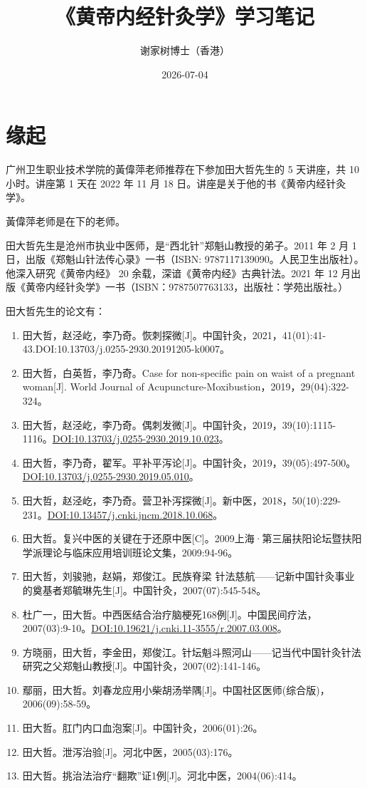 \documentclass[
]{book}
\title{《黄帝内经针灸学》学习笔记}
\author{谢家树博士（香港）}
\date{2026-07-04}
\begin{document}
\maketitle

{
\setcounter{tocdepth}{1}
\tableofcontents
}
\chapter*{缘起}\label{ux7f18ux8d77}

广州卫生职业技术学院的黃偉萍老师推荐在下参加田大哲先生的 5 天讲座，共 10 小时。讲座第 1 天在 2022 年 11 月 18 日。讲座是关于他的书《黄帝内经针灸学》。

黃偉萍老师是在下的老师。

田大哲先生是沧州市执业中医师，是``西北针''郑魁山教授的弟子。2011 年 2 月 1 日，出版《郑魁山针法传心录》一书（ISBN: 9787117139090。人民卫生出版社）。他深入研究《黄帝内经》 20 余载，深谙《黄帝内经》古典针法。2021 年 12 月出版《黄帝内经针灸学》一书（ISBN：9787507763133，出版社：学苑出版社。）

田大哲先生的论文有：

\begin{enumerate}
\def\labelenumi{\arabic{enumi}.}
\item
  田大哲，赵泾屹，李乃奇。恢刺探微{[}J{]}。中国针灸，2021，41(01):41-43.DOI:10.13703/j.0255-2930.20191205-k0007。
\item
  田大哲，白英哲，李乃奇。Case for non-specific pain on waist of a pregnant woman{[}J{]}. World Journal of Acupuncture-Moxibustion，2019，29(04):322-324。
\item
  田大哲，赵泾屹，李乃奇。偶刺发微{[}J{]}。中国针灸，2019，39(10):1115-1116。\url{DOI:10.13703/j.0255-2930.2019.10.023}。
\item
  田大哲，李乃奇，翟军。平补平泻论{[}J{]}。中国针灸，2019，39(05):497-500。\url{DOI:10.13703/j.0255-2930.2019.05.010}。
\item
  田大哲，赵泾屹，李乃奇。营卫补泻探微{[}J{]}。新中医，2018，50(10):229-231。\url{DOI:10.13457/j.cnki.jncm.2018.10.068}。
\item
  田大哲。复兴中医的关键在于还原中医{[}C{]}。2009上海·第三届扶阳论坛暨扶阳学派理论与临床应用培训班论文集，2009:94-96。
\item
  田大哲，刘骏驰，赵娟，郑俊江。民族脊梁 针法慈航------记新中国针灸事业的奠基者郑毓琳先生{[}J{]}。中国针灸，2007(07):545-548。
\item
  杜广一，田大哲。中西医结合治疗脑梗死168例{[}J{]}。中国民间疗法，2007(03):9-10。\url{DOI:10.19621/j.cnki.11-3555/r.2007.03.008}。
\item
  方晓丽，田大哲，李金田，郑俊江。针坛魁斗照河山------记当代中国针灸针法研究之父郑魁山教授{[}J{]}。中国针灸，2007(02):141-146。
\item
  鄢丽，田大哲。刘春龙应用小柴胡汤举隅{[}J{]}。中国社区医师(综合版)，2006(09):58-59。
\item
  田大哲。肛门内口血泡案{[}J{]}。中国针灸，2006(01):26。
\item
  田大哲。泄泻治验{[}J{]}。河北中医，2005(03):176。
\item
  田大哲。挑治法治疗``翻欺''证1例{[}J{]}。河北中医，2004(06):414。
\end{enumerate}
\end{document}
